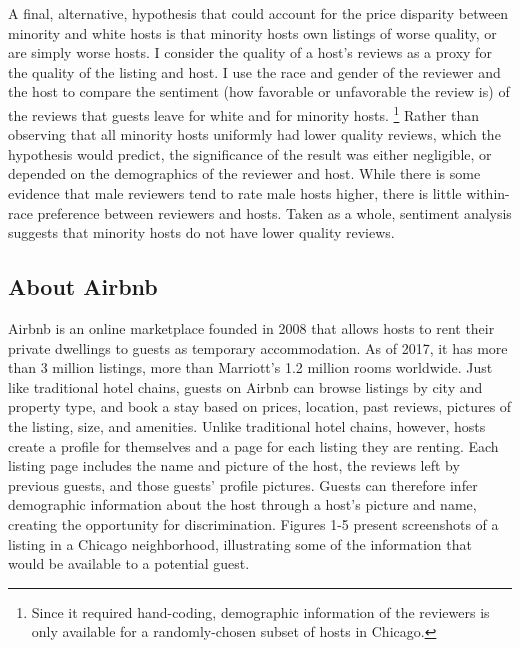 A final, alternative, hypothesis that could account for the price disparity between minority and white hosts is that minority hosts own listings of worse quality, or are simply worse hosts. I consider the quality of a host's reviews as a proxy for the quality of the listing and host. I use the race and gender of the reviewer and the host to compare the sentiment (how favorable or unfavorable the review is) of the reviews that guests leave for white and for minority hosts.%
	\footnote{Since it required hand-coding, demographic information of the reviewers is only available for a randomly-chosen subset of hosts in Chicago.} 
Rather than observing that all minority hosts uniformly had lower quality reviews, which the hypothesis would predict, the significance of the result was either negligible, or depended on the demographics of the reviewer and host. While there is some evidence that male reviewers tend to rate male hosts higher, there is little within-race preference between reviewers and hosts. Taken as a whole, sentiment analysis suggests that minority hosts do not have lower quality reviews. 

\subsection{About Airbnb} 
Airbnb is an online marketplace founded in 2008 that allows hosts to rent their private dwellings to guests as temporary accommodation. As of 2017, it has more than 3 million listings, more than Marriott's 1.2 million rooms worldwide.\cite{aboutus} Just like traditional hotel chains, guests on Airbnb can browse listings by city and property type, and book a stay based on prices, location, past reviews, pictures of the listing, size, and amenities. Unlike traditional hotel chains, however, hosts create a profile for themselves and a page for each listing they are renting. Each listing page includes the name and picture of the host, the reviews left by previous guests, and those guests' profile pictures. Guests can therefore infer demographic information about the host through a host's picture and name, creating the opportunity for discrimination. Figures 1-5 present screenshots of a listing in a Chicago neighborhood, illustrating some of the information that would be available to a potential guest. 


